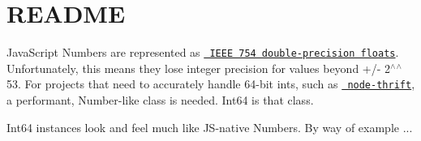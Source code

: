 \chapter{README}
\hypertarget{md_node__modules_2node-int64_2README}{}\label{md_node__modules_2node-int64_2README}
Java\+Script Numbers are represented as \href{http://steve.hollasch.net/cgindex/coding/ieeefloat.html}{\texttt{ IEEE 754 double-\/precision floats}}. Unfortunately, this means they lose integer precision for values beyond +/-\/ 2\texorpdfstring{$^\wedge$}{\string^}\texorpdfstring{$^\wedge$}{\string^}53. For projects that need to accurately handle 64-\/bit ints, such as \href{https://github.com/wadey/node-thrift}{\texttt{ node-\/thrift}}, a performant, Number-\/like class is needed. Int64 is that class.

Int64 instances look and feel much like JS-\/native Numbers. By way of example ... 
